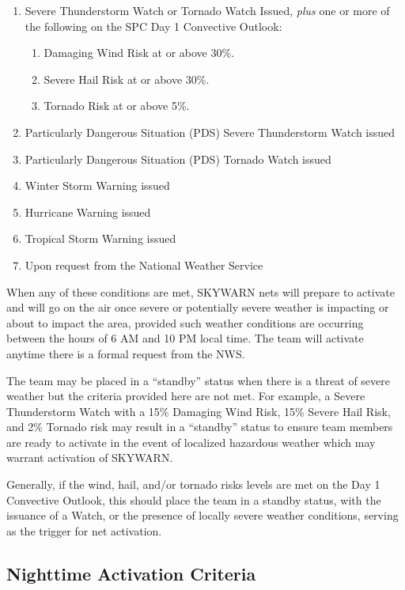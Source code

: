 \documentclass[pdflatex,letterpaper,twoside,12pt]{book}
\begin{document}
\begin{enumerate}
    \item Severe Thunderstorm Watch or Tornado Watch Issued, \emph{plus} one or more of the following on the SPC Day 1 Convective Outlook:
    \begin{enumerate}
        \item Damaging Wind Risk at or above 30\%.
        \item Severe Hail Risk at or above 30\%.
        \item Tornado Risk at or above 5\%.
    \end{enumerate}
    \item Particularly Dangerous Situation (PDS) Severe Thunderstorm Watch issued
    \item Particularly Dangerous Situation (PDS) Tornado Watch issued
    \item Winter Storm Warning issued
    \item Hurricane Warning issued
    \item Tropical Storm Warning issued
    \item Upon request from the National Weather Service
\end{enumerate}

When any of these conditions are met, SKYWARN nets will prepare to activate and will go on the air once severe or potentially severe weather is impacting or about to impact the area, provided such weather conditions are occurring between the hours of 6 AM and 10 PM local time.  The team will activate anytime there is a formal request from the NWS.

The team may be placed in a ``standby'' status when there is a threat of severe weather but the criteria provided here are not met.  For example, a Severe Thunderstorm Watch with a 15\% Damaging Wind Risk, 15\% Severe Hail Risk, and 2\% Tornado risk may result in a ``standby'' status to ensure team members are ready to activate in the event of localized hazardous weather which may warrant activation of SKYWARN.

Generally, if the wind, hail, and/or tornado risks levels are met on the Day 1 Convective Outlook, this should place the team in a standby status, with the issuance of a Watch, or the presence of locally severe weather conditions, serving as the trigger for net activation.

\subsection{Nighttime Activation Criteria}\label{nighttime-criteria}
\end{document}
